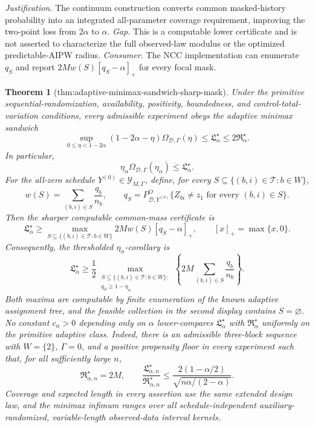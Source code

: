 \documentclass{article}
\newtheorem{theorem}{Theorem}
\begin{document}
\par\smallskip\noindent \textit{Justification.} The continuum construction converts common masked-history probability into an integrated all-parameter coverage requirement, improving the two-point loss from \(2\alpha\) to \(\alpha\). \textit{Gap.} This is a computable lower certificate and is not asserted to characterize the full observed-law modulus or the optimized predictable-AIPW radius. \textit{Consumer.} The NCC implementation can enumerate \(q_S\) and report \(2Mw(S)[q_S-\alpha]_+\) for every focal mask.

\begin{theorem}[thm:adaptive-minimax-sandwich-sharp-mask]\label{thm:adaptive-minimax-sandwich-sharp-mask}
Under the primitive sequential-randomization, availability, positivity, boundedness, and control-total-variation conditions, every admissible experiment obeys the adaptive minimax sandwich
\[
 \sup_{0\le\eta<1-2\alpha}
 (1-2\alpha-\eta)\Omega_{\mathcal D,\Gamma}(\eta)
 \le \mathfrak L_\alpha^\star
 \le2\mathfrak R_\alpha^\star.
\]
In particular,
\[
 \eta_\alpha\Omega_{\mathcal D,\Gamma}(\eta_\alpha)
 \le\mathfrak L_\alpha^\star.
\]
For the all-zero schedule \(Y^{(0)}\in\mathcal Y_{M,\Gamma}\), define, for every \(S\subseteq\{(b,i)\in\mathcal T:b\in W\}\),
\[
 w(S)=\sum_{(b,i)\in S}\frac{q_b}{n_b},
 \qquad
 q_S=P^O_{\mathcal D,Y^{(0)}}\{Z_{bi}\ne z_1\text{ for every }(b,i)\in S\}.
\]
Then the sharper computable common-mass certificate is
\[
 \mathfrak L_\alpha^\star
 \ge
 \max_{S\subseteq\{(b,i)\in\mathcal T:b\in W\}}
 2Mw(S)[q_S-\alpha]_+,
 \qquad [x]_+=\max\{x,0\}.
\]
Consequently, the thresholded \(\eta_\alpha\)-corollary is
\[
 \mathfrak L_\alpha^\star
 \ge \frac12
 \max_{\substack{S\subseteq\{(b,i)\in\mathcal T:b\in W\}:\\
 q_S\ge1-\eta_\alpha}}
 \left\{2M\sum_{(b,i)\in S}\frac{q_b}{n_b}\right\}.
\]
Both maxima are computable by finite enumeration of the known adaptive assignment tree, and the feasible collection in the second display contains \(S=\varnothing\).  No constant \(c_\alpha>0\) depending only on \(\alpha\) lower-compares \(\mathfrak L_\alpha^\star\) with \(\mathfrak R_\alpha^\star\) uniformly on the primitive adaptive class.  Indeed, there is an admissible three-block sequence with \(W=\{2\}\), \(\Gamma=0\), and a positive propensity floor in every experiment such that, for all sufficiently large \(n\),
\[
 \mathfrak R_{\alpha,n}^\star=2M,
 \qquad
 \frac{\mathfrak L_{\alpha,n}^\star}{\mathfrak R_{\alpha,n}^\star}
 \le
 \frac{2(1-\alpha/2)}{\sqrt{n\alpha/(2-\alpha)}}.
\]
Coverage and expected length in every assertion use the same extended design law, and the minimax infimum ranges over all schedule-independent auxiliary-randomized, variable-length observed-data interval kernels.
\end{theorem}
\end{document}
